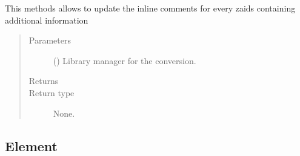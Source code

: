 \documentclass[letterpaper,10pt,english]{sphinxmanual}
\begin{document}
\begin{fulllineitems}

\begin{fulllineitems}
\label{\detokenize{api/inputgeneration:matreader.SubMaterial.update_info}}
This methods allows to update the in\sphinxhyphen{}line comments for every zaids
containing additional information
\begin{quote}\begin{description}
\item[{Parameters}] \leavevmode
{} ({\hyperref[\detokenize{api/initobjects:libmanager.LibManager}]{}}) \textendash{} Library manager for the conversion.

\item[{Returns}] \leavevmode


\item[{Return type}] \leavevmode
None.

\end{description}\end{quote}

\end{fulllineitems}


\end{fulllineitems}



\subsection{Element}
\label{\detokenize{api/inputgeneration:element}}
\end{document}
